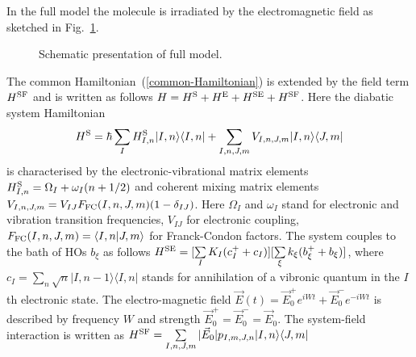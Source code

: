 \documentclass[12pt,twoside,a4paper]{report}
\begin{document}
{In the full model the molecule is irradiated by the electromagnetic field
as sketched in Fig.~\ref{full-schem}.
\footnotesize\begin{figure}[htb]\centering
  \parbox{5cm}
  {\rule{0cm}{0cm}
\epsfxsize=5cm}
\caption[Schematic presentation of full model]
{\small  Schematic presentation of full model.
\label{full-schem}
}
\end{figure}\normalsize
The common Hamiltonian~(\ref{common-Hamiltonian}) 
is extended by the field term $H^{\rm SF}$ and is written as follows
$H=H^{\rm S}+H^{\rm E}+H^{\rm SE}+H^{\rm SF}$.
Here the diabatic system Hamiltonian 
$$H^{\rm S}
            =
                \hbar 
                \sum \limits_I 
                               H_{I,n}^{\rm S} 
                               |I,n \rangle 
                               \langle I,n|
              + \sum \limits_{I,n,J,m}
                               V_{I,n,J,m}
                               |I,n \rangle 
                               \langle J,m|$$
is characterised by the electronic-vibrational matrix elements
$H
 _{I,n}
 ^{\rm S}
           =
                \Omega_I
              + \omega_I
                (n+1/2)$
and coherent mixing matrix elements
$V
 _{I,n,J,m}
             =
                  V_{IJ}
                  F_{\rm FC}(I,n,J,m)
                  (1-\delta_{IJ})$.
Here $\Omega_I$ and $\omega_I$ stand for electronic and vibration transition frequencies,
$V_{IJ}$ for  electronic coupling, 
$F_{\rm FC}
 (I,n,J,m)
            =
                \langle 
                    I,n | J,m 
                \rangle $ 
for Franck-Condon factors.
The system couples to the bath of HOs $b_\xi$
as follows
$H^{\rm SE}
         =
             [\sum \limits_{I} 
                  {K_I}
                  (c_I^+ +c_I)] 
             [\sum \limits_{\xi} 
                  {k_\xi} 
                  (b_\xi^+ + b_\xi)]$, 
where 
$c_I
      =
           \sum \limits_n 
              \sqrt{n} |I,n-1 \rangle \langle I,n|$
stands for annihilation of a vibronic quantum in 
the $I$th electronic state. 
%
The electro-magnetic field 
$\vec 
 E (t) 
        = 
             \vec E_0^+ e^{ iWt} 
          +  \vec E_0^- e^{-iWt}$
is described by frequency $W$ and  strength 
$\vec 
 E_0^+
        =
             \vec E_0^- = \vec E_0$. 
The system-field interaction is written as 
$H^{\rm SF}
          =
              \sum \limits_{I,n,J,m} 
                  |\vec E_0| 
                  {p_{I,m,J,n}} 
                  | I,n \rangle \langle J,m|$
}
\end{document}
